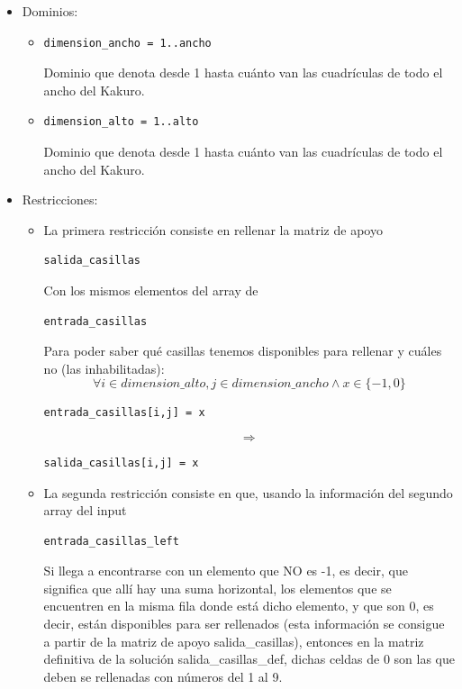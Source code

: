 \documentclass[12pt]{article}
\begin{document}
\begin{itemize}
\begin{itemize}
\end{itemize}
\item Dominios:
\begin{itemize}
\item \begin{verbatim}
dimension_ancho = 1..ancho
\end{verbatim}
Dominio que denota desde 1 hasta cuánto van las cuadrículas de todo el ancho del Kakuro.
\item \begin{verbatim}
dimension_alto = 1..alto
\end{verbatim}
Dominio que denota desde 1 hasta cuánto van las cuadrículas de todo el ancho del Kakuro.
\end{itemize}
\item Restricciones:
\begin{itemize}
\item La primera restricción consiste en rellenar la matriz de apoyo
\begin{verbatim}
salida_casillas
\end{verbatim}
Con los mismos elementos del array de
\begin{verbatim}
entrada_casillas
\end{verbatim}
Para poder saber qué casillas tenemos disponibles para rellenar y cuáles no (las inhabilitadas):
\begin{equation*}
\forall i \in dimension\_alto, j \in dimension\_ancho \land x \in \{-1, 0\}
\end{equation*}
\begin{verbatim}
entrada_casillas[i,j] = x
\end{verbatim}
\begin{equation*}
\Rightarrow 
\end{equation*}
\begin{verbatim}
salida_casillas[i,j] = x
\end{verbatim}
\item La segunda restricción consiste en que, usando la información del segundo array del input
\begin{verbatim}
entrada_casillas_left
\end{verbatim}
Si llega a encontrarse con un elemento que NO es -1, es decir, que significa que allí hay una suma horizontal, los elementos que se encuentren en la misma fila donde está dicho elemento, y que son 0, es decir, están disponibles para ser rellenados (esta información se consigue a partir de la matriz de apoyo salida\_casillas), entonces en la matriz definitiva de la solución salida\_casillas\_def, dichas celdas de 0 son las que deben se rellenadas con números del 1 al 9.

\end{itemize}
\end{itemize}
\end{document}
